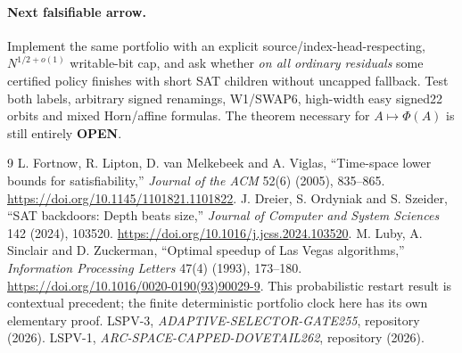 \documentclass[11pt]{article}
\begin{document}
\paragraph{Next falsifiable arrow.} Implement the same portfolio with an explicit source/index-head-respecting, $N^{1/2+o(1)}$ writable-bit cap, and ask whether \emph{on all ordinary residuals} some certified policy finishes with short SAT children without uncapped fallback. Test both labels, arbitrary signed renamings, W1/SWAP6, high-width easy signed22 orbits and mixed Horn/affine formulas. The theorem necessary for $A\mapsto\Phi(A)$ is still entirely \textbf{OPEN}.

\begin{thebibliography}{9}
 L. Fortnow, R. Lipton, D. van Melkebeek and A. Viglas, ``Time-space lower bounds for satisfiability,'' \emph{Journal of the ACM} 52(6) (2005), 835--865. \url{https://doi.org/10.1145/1101821.1101822}.
 J. Dreier, S. Ordyniak and S. Szeider, ``SAT backdoors: Depth beats size,'' \emph{Journal of Computer and System Sciences} 142 (2024), 103520. \url{https://doi.org/10.1016/j.jcss.2024.103520}.
 M. Luby, A. Sinclair and D. Zuckerman, ``Optimal speedup of Las Vegas algorithms,'' \emph{Information Processing Letters} 47(4) (1993), 173--180. \url{https://doi.org/10.1016/0020-0190(93)90029-9}. This probabilistic restart result is contextual precedent; the finite deterministic portfolio clock here has its own elementary proof.
 LSPV-3, \emph{ADAPTIVE-SELECTOR-GATE255}, repository  (2026).
 LSPV-1, \emph{ARC-SPACE-CAPPED-DOVETAIL262}, repository  (2026).
\end{thebibliography}
\end{document}
